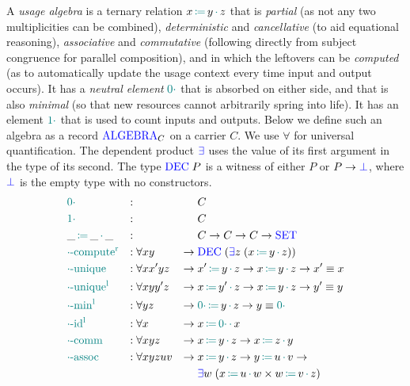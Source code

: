 \documentclass[]{llncs}
\newcommand{\type}[1]{\textcolor{blue}{\operatorname{#1}}}
\newcommand{\func}[1]{\textcolor{teal}{\operatorname{#1}}}
\newcommand{\op}[3]{#1 \, \func{\coloneqq} \, #2 \, \func{\cdot} \, #3}
\newcommand{\zero}{\func{0\cdot}}
\newcommand{\one}{\func{1\cdot}}
\newcommand{\Set}{\type{SET}}
\newcommand{\Algebra}{\type{ALGEBRA}}
\begin{document}
\begin{nidefinition}
  A \emph{usage algebra} is a ternary relation $\op{x}{y}{z}$ that is \emph{partial} (as not any two multiplicities can be combined), \emph{deterministic} and \emph{cancellative} (to aid equational reasoning), \emph{associative} and \emph{commutative} (following directly from subject congruence for parallel composition), and in which the leftovers can be \emph{computed} (as to automatically update the usage context every time input and output occurs).
  It has a \emph{neutral element} $\zero$ that is absorbed on either side, and that is also \emph{minimal} (so that new resources cannot arbitrarily spring into life).
  It has an element $\one$ that is used to count inputs and outputs.
  Below we define such an algebra as a record $\Algebra_C$ on a carrier $C$.
  We use $\forall$ for universal quantification.
  The dependent product $\type{\exists}$ uses the value of its first argument in the type of its second.
  The type $\type{DEC} \; P$ is a witness of either $P$ or $P \to \type{\bot}$, where $\type{\bot}$ is the empty type with no constructors.
  \begin{equation*}
  \begin{aligned}
    &\zero                   &:{} &                 &        & C \\
    &\one                    &:{} &                 &        & C \\
    &\op{\_}{\_}{\_}         &:{} &                 &        & C \to C \to C \to \Set \\
    &\func{\cdot-compute^r}  &:{} &\forall x y       & \to \; & \type{DEC} \; (\type{\exists} z  \; (\op{x}{y}{z})) \\
    &\func{\cdot-unique}     &:{} &\forall x x' y z  & \to \; & \op{x'}{y}{z} \to \op{x}{y}{z} \to x' \equiv x \\
    &\func{\cdot-unique^l}   &:{} &\forall x y y' z  & \to \; & \op{x}{y'}{z} \to \op{x}{y}{z} \to y' \equiv y \\
    &\func{\cdot-min^l}      &:{} &\forall y z        & \to \; & \op{\zero}{y}{z} \to y \equiv \zero \\
    &\func{\cdot-id^l}       &:{} &\forall x         & \to \; & \op{x}{\zero}{x} \\
    &\func{\cdot-comm}       &:{} &\forall x y z     & \to \; & \op{x}{y}{z} \to \op{x}{z}{y} \\
    &\func{\cdot-assoc}      &:{} &\forall x y z u v & \to \; & \op{x}{y}{z} \to \op{y}{u}{v} \to \\
    &                        &    &                  &        & \type{\exists} w  \; (\op{x}{u}{w} \times \op{w}{v}{z})
  \end{aligned}
  \end{equation*}
\end{nidefinition}
\end{document}
